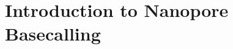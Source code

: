 \documentclass[]{scrartcl}
\begin{document}
\section{Introduction to Nanopore Basecalling}
%
%
%
\end{document}
